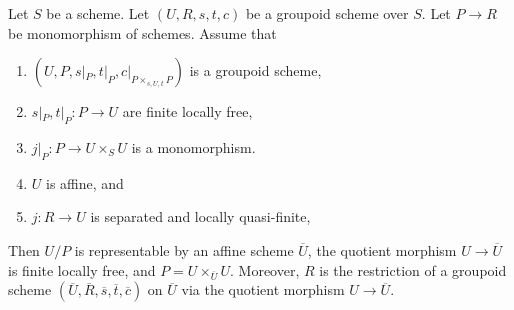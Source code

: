 \begin{lemma}
\label{lemma-divide-subgroupoid}
Let $S$ be a scheme.
Let $(U, R, s, t, c)$ be a groupoid scheme over $S$.
Let $P \to R$ be monomorphism of schemes. Assume that
\begin{enumerate}
\item $(U, P, s|_P, t|_P, c|_{P \times_{s, U, t}P})$ is a groupoid scheme,
\item $s|_P, t|_P : P \to U$ are finite locally free,
\item $j|_P : P \to U \times_S U$ is a monomorphism.
\item $U$ is affine, and
\item $j : R \to U$ is separated and locally quasi-finite,
\end{enumerate}
Then $U/P$ is representable by an affine scheme $\overline{U}$, the
quotient morphism $U \to \overline{U}$ is finite locally free, and
$P = U \times_{\overline{U}} U$. Moreover, $R$ is the restriction of a
groupoid scheme
$(\overline{U}, \overline{R}, \overline{s}, \overline{t}, \overline{c})$
on $\overline{U}$ via the quotient morphism $U \to \overline{U}$.
\end{lemma}

